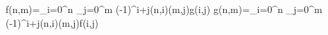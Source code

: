 f(n,m)=\sum_{i=0}^n \sum_{j=0}^m (-1)^{i+j}(n,i)(m,j)g(i,j) \iff g(n,m)=\sum_{i=0}^n \sum_{j=0}^m (-1)^{i+j}(n,i)(m,j)f(i,j)
